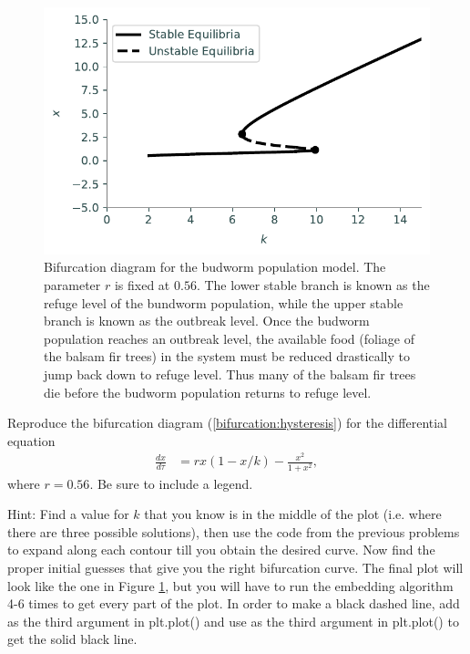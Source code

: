 \newpage
\begin{figure}
\centering
\includegraphics[width=\textwidth]{figures/BudwormPopulation.pdf}
\caption{Bifurcation diagram for the budworm population model.
The parameter $r$ is fixed at $0.56.$
The lower stable branch is known as the refuge level of the bundworm population, while the upper stable branch is known as the outbreak level.
Once the budworm population reaches an outbreak level, the available food (foliage of the balsam fir trees) in the system must be reduced drastically to jump back down to refuge level.
Thus many of the balsam fir trees die before the budworm population returns to refuge level.}
\label{bifurcation:budworm}
\end{figure}

\newpage
\begin{problem} %
Reproduce the bifurcation diagram (\ref{bifurcation:hysteresis}) for the differential equation
\begin{align*}
	\frac{dx}{d \tau} &= rx(1-x/k) - \frac{x^2}{1+x^2},
\end{align*}
where $r = 0.56$.
Be sure to include a legend.

Hint: Find a value for $k$ that you know is in the middle of the plot (i.e. where there are three possible solutions), then use the code from the previous problems to expand along each contour till you obtain the desired curve.
Now find the proper initial guesses that give you the right bifurcation curve.
The final plot will look like the one in Figure \ref{bifurcation:budworm}, but you will have to run the embedding algorithm 4-6 times to get every part of the plot. In order to make a black dashed line, add  as the third argument in plt.plot() and use  as the third argument in plt.plot() to get the solid black line.
\end{problem} 

